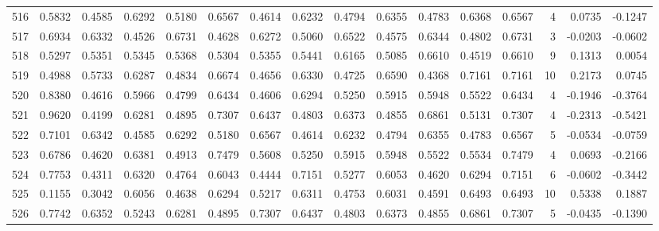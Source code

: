 \begin{tabular}{lrrrrrrrrrrrrrrr}
516 &      0.5832 &  0.4585 &  0.6292 &  0.5180 &  0.6567 &  0.4614 &  0.6232 &  0.4794 &  0.6355 &  0.4783 &   0.6368 &     0.6567 &      4 &                    0.0735 &                    -0.1247 \\
517 &      0.6934 &  0.6332 &  0.4526 &  0.6731 &  0.4628 &  0.6272 &  0.5060 &  0.6522 &  0.4575 &  0.6344 &   0.4802 &     0.6731 &      3 &                   -0.0203 &                    -0.0602 \\
518 &      0.5297 &  0.5351 &  0.5345 &  0.5368 &  0.5304 &  0.5355 &  0.5441 &  0.6165 &  0.5085 &  0.6610 &   0.4519 &     0.6610 &      9 &                    0.1313 &                     0.0054 \\
519 &      0.4988 &  0.5733 &  0.6287 &  0.4834 &  0.6674 &  0.4656 &  0.6330 &  0.4725 &  0.6590 &  0.4368 &   0.7161 &     0.7161 &     10 &                    0.2173 &                     0.0745 \\
520 &      0.8380 &  0.4616 &  0.5966 &  0.4799 &  0.6434 &  0.4606 &  0.6294 &  0.5250 &  0.5915 &  0.5948 &   0.5522 &     0.6434 &      4 &                   -0.1946 &                    -0.3764 \\
521 &      0.9620 &  0.4199 &  0.6281 &  0.4895 &  0.7307 &  0.6437 &  0.4803 &  0.6373 &  0.4855 &  0.6861 &   0.5131 &     0.7307 &      4 &                   -0.2313 &                    -0.5421 \\
522 &      0.7101 &  0.6342 &  0.4585 &  0.6292 &  0.5180 &  0.6567 &  0.4614 &  0.6232 &  0.4794 &  0.6355 &   0.4783 &     0.6567 &      5 &                   -0.0534 &                    -0.0759 \\
523 &      0.6786 &  0.4620 &  0.6381 &  0.4913 &  0.7479 &  0.5608 &  0.5250 &  0.5915 &  0.5948 &  0.5522 &   0.5534 &     0.7479 &      4 &                    0.0693 &                    -0.2166 \\
524 &      0.7753 &  0.4311 &  0.6320 &  0.4764 &  0.6043 &  0.4444 &  0.7151 &  0.5277 &  0.6053 &  0.4620 &   0.6294 &     0.7151 &      6 &                   -0.0602 &                    -0.3442 \\
525 &      0.1155 &  0.3042 &  0.6056 &  0.4638 &  0.6294 &  0.5217 &  0.6311 &  0.4753 &  0.6031 &  0.4591 &   0.6493 &     0.6493 &     10 &                    0.5338 &                     0.1887 \\
526 &      0.7742 &  0.6352 &  0.5243 &  0.6281 &  0.4895 &  0.7307 &  0.6437 &  0.4803 &  0.6373 &  0.4855 &   0.6861 &     0.7307 &      5 &                   -0.0435 &                    -0.1390 \\

\end{tabular}
